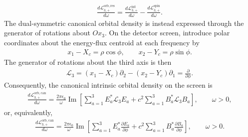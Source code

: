 \begin{align}
  \frac{d\mathcal L^{\mathrm{orb,res}}_{3,+}}{d\omega}
  =\frac{d\mathcal L^{\mathrm{int}}_{3,+}}{d\omega}
  -\frac{d\mathcal L^{\mathrm{spin}}_{3,+}}{d\omega}.
  \label{eq:one-sided-intrinsic-orbital-angular-momentum-density-dif}
\end{align}
The dual-symmetric canonical orbital density is instead expressed through the
generator of rotations about $Ox_3$.  On the detector screen, introduce polar
coordinates about the energy-flux centroid at each frequency by
\begin{align}
  x_1-X_c=\rho\cos\phi,
  \qquad
  x_2-Y_c=\rho\sin\phi.
  \label{eq:screen-polar-coordinates-about-centroid}
\end{align}
The generator of rotations about the third axis is then
\begin{align}
  \mathscr L_3
  =(x_1-X_c)\partial_2-(x_2-Y_c)\partial_1
  =\frac{\partial}{\partial\phi}.
  \label{eq:intrinsic-orbital-rotation-generator}
\end{align}
Consequently, the canonical intrinsic orbital density on the screen is
\begin{align}
  \frac{d\mathcal L^{\mathrm{orb,can}}_{3,+}}{d\omega}
  =\frac{2\pi\epsilon_0}{\omega}\operatorname{Im}\left[
    \sum_{a=1}^{3}E_a^*\mathscr L_3E_a
    +c^2\sum_{a=1}^{3}B_a^*\mathscr L_3B_a
  \right],
  \qquad \omega>0,
  \label{eq:one-sided-intrinsic-orbital-angular-momentum-density}
\end{align}
or, equivalently,
\begin{align}
  \frac{d\mathcal L^{\mathrm{orb,can}}_{3,+}}{d\omega}
  =\frac{2\pi\epsilon_0}{\omega}\operatorname{Im}\left[
    \sum_{a=1}^{3}E_a^*\frac{\partial E_a}{\partial\phi}
    +c^2\sum_{a=1}^{3}B_a^*\frac{\partial B_a}{\partial\phi}
  \right],
  \qquad \omega>0.
  \label{eq:one-sided-intrinsic-orbital-angular-momentum-density-azimuthal}
\end{align}


